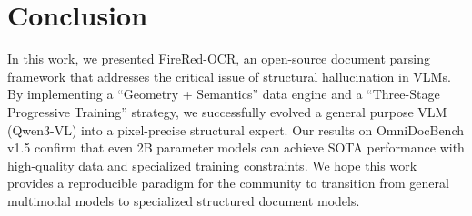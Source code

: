 \section{Conclusion}
In this work, we presented FireRed-OCR, an open-source document parsing framework that addresses the critical issue of structural hallucination in VLMs. By implementing a ``Geometry + Semantics'' data engine and a ``Three-Stage Progressive Training'' strategy, we successfully evolved a general purpose VLM (Qwen3-VL) into a pixel-precise structural expert. Our results on OmniDocBench v1.5 confirm that even 2B parameter models can achieve SOTA performance with high-quality data and specialized training constraints. We hope this work provides a reproducible paradigm for the community to transition from general multimodal models to specialized structured document models.